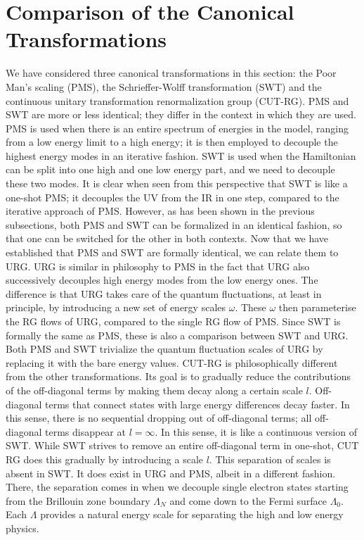 \documentclass[12pt,twoside]{report}
\numberwithin{equation}{section}
\begin{document}
\section{Comparison of the Canonical Transformations}
We have considered three canonical transformations in this section: the Poor Man's scaling (PMS), the Schrieffer-Wolff transformation (SWT) and the continuous unitary transformation renormalization group (CUT-RG). PMS and SWT are more or less identical; they differ in the context in which they are used. PMS is used when there is an entire spectrum of energies in the model, ranging from a low energy limit to a high energy; it is then employed to decouple the highest energy modes in an iterative fashion. SWT is used when the Hamiltonian can be split into one high and one low energy part, and we need to decouple these two modes. It is clear when seen from this perspective that SWT is like a one-shot PMS; it decouples the UV from the IR in one step, compared to the iterative approach of PMS. However, as has been shown in the previous subsections, both PMS and SWT can be formalized in an identical fashion, so that one can be switched for the other in both contexts.
\pb Now that we have established that PMS and SWT are formally identical, we can relate them to URG. URG is similar in philosophy to PMS in the fact that URG also successively decouples high energy modes from the low energy ones. The difference is that URG takes care of the quantum fluctuations, at least in principle, by introducing a new set of energy scales \(\omega\). These \(\omega\) then parameterise the RG flows of URG, compared to the single RG flow of PMS. Since SWT is formally the same as PMS, these is also a comparison between SWT and URG. Both PMS and SWT trivialize the quantum fluctuation scales of URG by replacing it with the bare energy values.
\pb CUT-RG is philosophically different from the other transformations. Its goal is to gradually reduce the contributions of the off-diagonal terms by making them decay along a certain scale \(l\). Off-diagonal terms that connect states with large energy differences decay faster. In this sense, there is no sequential dropping out of off-diagonal terms; all off-diagonal terms disappear at \(l=\infty\). In this sense, it is like a continuous version of SWT. While SWT strives to remove an entire off-diagonal term in one-shot, CUT RG does this gradually by introducing a scale \(l\). This separation of scales is absent in SWT. It does exist in URG and PMS, albeit in a different fashion. There, the separation comes in when we decouple single electron states starting from the Brillouin zone boundary \(\Lambda_N\) and come down to the Fermi surface \(\Lambda_0\). Each \(\Lambda\) provides a natural energy scale for separating the high and low energy physics.
\end{document}

